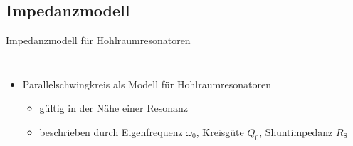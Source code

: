 \documentclass[12pt,xcolor=dvipsnames,professionalfonts]{beamer}
\begin{document}
\subsection{Impedanzmodell}
\begin{frame}{Impedanzmodell für Hohlraumresonatoren}
	\begin{columns}[c]
		\begin{itemize}
			\item Parallelschwingkreis als Modell für Hohlraumresonatoren
			\begin{itemize}
				\setlength\itemsep{0.25em}
				\item gültig in der Nähe einer Resonanz
				
				\item beschrieben durch Eigenfrequenz $\omega_0$, Kreisgüte $Q_0$, Shuntimpedanz $R_\mathrm{S}$
			\end{itemize}
		\end{itemize}
		

\end{columns}
\end{frame}
\end{document}
